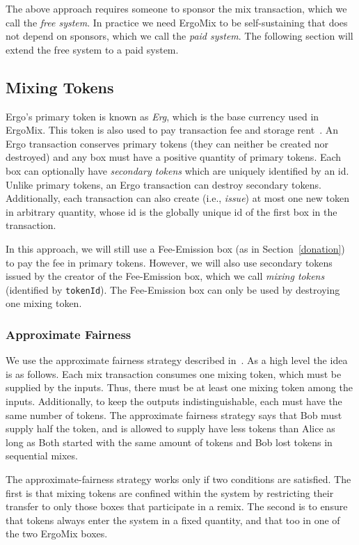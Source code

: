 \documentclass[11pt]{article}
\newcommand{\mixname}{ErgoMix\xspace}
\begin{document}
The above approach requires someone to sponsor the mix transaction, which we call the {\em free system}. In practice we need \mixname to be self-sustaining that does not depend on sponsors, which we call the {\em paid system}. 
The following section will extend the free system to a paid system. 

\subsection{Mixing Tokens}

Ergo's primary token is known as {\em Erg}, which is the base currency used in \mixname. This token is also used to pay transaction fee and storage rent~\cite{chepurnoy2018systematic}. An Ergo transaction conserves primary tokens (they can neither be created nor destroyed) and any box must have a positive quantity of primary tokens. 
Each box can optionally have {\em secondary tokens} which are uniquely identified by an id. Unlike primary tokens, an Ergo transaction can destroy secondary tokens. Additionally, each transaction can also create (i.e., {\em issue}) at most one new token in arbitrary quantity, whose id is the globally unique id of the first box in the transaction. 

In this approach, we will still use a Fee-Emission box (as in Section~\ref{donation}) to pay the fee in primary tokens. However, we will also use secondary tokens issued by the creator of the Fee-Emission box, which we call {\em mixing tokens} (identified by \texttt{tokenId}). The Fee-Emission box can only be used by destroying one mixing token.

\subsubsection{Approximate Fairness}

We use the approximate fairness strategy described in~\cite{advtutorial}. As a high level the idea is as follows.
Each mix transaction consumes one mixing token, which must be supplied by the inputs. Thus, there must be at least one mixing token among the inputs. Additionally, to keep the outputs indistinguishable, each must have the same number of tokens. The approximate fairness strategy says that Bob must supply half the token, and is allowed to supply have less tokens than Alice as long as Both started with the same amount of tokens and Bob lost tokens in sequential mixes.  

The approximate-fairness strategy works only if two conditions are satisfied. The first is that mixing tokens are confined within the system by restricting their transfer to only those boxes that participate in a remix. 
The second is to ensure that tokens always enter the system in a fixed quantity, and that too in one of the two \mixname boxes. 
\end{document}
